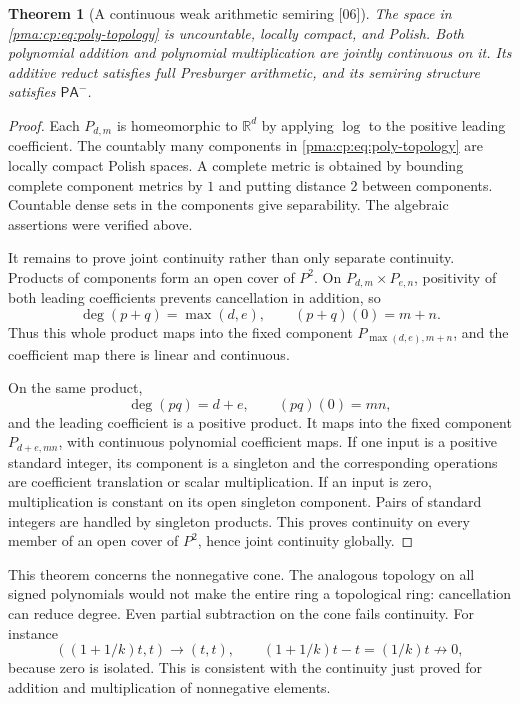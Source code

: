 \documentclass[11pt]{article}
\numberwithin{equation}{section}
\newtheorem{theorem}{Theorem}[section]
\theoremstyle{definition}
\theoremstyle{remark}
\newcommand{\R}{\mathbb R}
\newcommand{\src}[1]{\textup{\textsf{\small[#1]}}}
\newcommand{\PAminus}{\mathsf{PA}^{-}}
\begin{document}
\begin{theorem}[A continuous weak arithmetic semiring \src{06}]
\label{pma:cp:thm:polynomial}
The space in \eqref{pma:cp:eq:poly-topology} is uncountable, locally compact,
and Polish. Both polynomial addition and polynomial multiplication are
jointly continuous on it. Its additive reduct satisfies full Presburger
arithmetic, and its semiring structure satisfies $\PAminus$.
\end{theorem}

\begin{proof}
Each $P_{d,m}$ is homeomorphic to $\R^d$ by applying $\log$ to the
positive leading coefficient. The countably many components in
\eqref{pma:cp:eq:poly-topology} are locally compact Polish spaces. A complete
metric is obtained by bounding complete component metrics by $1$ and
putting distance $2$ between components. Countable dense sets in the
components give separability. The algebraic assertions were verified
above.

It remains to prove joint continuity rather than only separate
continuity. Products of components form an open cover of $P^2$.
On $P_{d,m}\times P_{e,n}$, positivity of both leading coefficients
prevents cancellation in addition, so
\[
 \deg(p+q)=\max(d,e),\qquad (p+q)(0)=m+n.
\]
Thus this whole product maps into the fixed component
$P_{\max(d,e),m+n}$, and the coefficient map there is linear and
continuous.

On the same product,
\[
 \deg(pq)=d+e,\qquad (pq)(0)=mn,
\]
and the leading coefficient is a positive product. It maps into the
fixed component $P_{d+e,mn}$, with continuous polynomial coefficient
maps. If one input is a positive standard integer, its component is a
singleton and the corresponding operations are coefficient translation
or scalar multiplication. If an input is zero, multiplication is
constant on its open singleton component. Pairs of standard integers
are handled by singleton products. This proves continuity on every
member of an open cover of $P^2$, hence joint continuity globally.
\end{proof}

This theorem concerns the nonnegative cone. The analogous topology
on all signed polynomials would not make the entire ring a topological
ring: cancellation can reduce degree. Even partial subtraction on the
cone fails continuity. For instance
\[
 ((1+1/k)t,t)\longrightarrow(t,t),\qquad
 (1+1/k)t-t=(1/k)t\not\longrightarrow0,
\]
because zero is isolated. This is consistent with the continuity just
proved for addition and multiplication of nonnegative elements.
\end{document}
